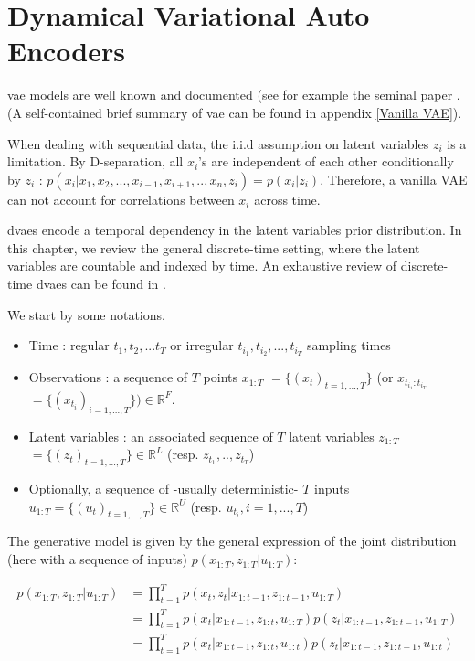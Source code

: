\chapter{Dynamical Variational Auto Encoders}\label{sec:DVAEs}

\gls{vae} models are well known and documented (see for example the seminal paper \cite{kingma_introduction_2019}. (A self-contained brief summary of \gls{vae} can be found in appendix \ref{Vanilla VAE}). 

When dealing with sequential data, the i.i.d assumption on latent variables $z_i$ is a limitation. By D-separation, all $x_i$'s are independent of each other conditionally by $z_i$ : $p(x_i \vert x_1, x_2,...,x_{i-1},x_{i+1},..,x_n,z_i) = p(x_i \vert z_i)$. Therefore, a vanilla VAE can not account for correlations between $x_i$ across time.

\glspl{dvae} encode a temporal dependency in the latent variables prior distribution. In this chapter, we review the general discrete-time setting, where the latent variables are countable and indexed by time. An exhaustive review of discrete-time \glspl{dvae} can be found in \cite{girin_dynamical_2022}.

We start by some notations.

\begin{tcolorbox}[colback=blue!5!white,colframe=black!75!black,title=Notations]
\begin{itemize}
    \item Time : regular $t_1, t_2,... t_T$ or irregular $t_{i_1}, t_{i_2},..., t_{i_T}$ sampling times
    \item Observations : a sequence of $T$ points \textbf{$x_{1:T}$} $= \{(x_t)_{t=1,...,T}\}$ (or \textbf{$x_{t_{i_1}:t_{i_T}}$} $= \{(x_{t_i})_{i=1,...,T}\}) \in \mathbb{R}^F$.
    \item Latent variables : an associated sequence of $T$ latent variables \textbf{$z_{1:T}$} $= \{(z_t)_{t=1,...,T}\} \in \mathbb{R}^L$ (resp. $z_{t_1},..,z_{t_T}$)
    \item Optionally, a sequence of -usually deterministic- $T$ inputs $u_{1:T} = \{(u_t)_{t=1,...,T}\} \in \mathbb{R}^U$ (resp. $u_{t_i}, i=1,...,T$)
\end{itemize}
\end{tcolorbox}

The generative model is given by the general expression of the joint distribution (here with a sequence of inputs) $p(x_{1:T}, z_{1:T} \vert u_{1:T})$:

\begin{align*}
    p(x_{1:T}, z_{1:T} \vert u_{1:T}) &= \prod_{t=1}^T p(x_t, z_t \vert x_{1:t-1}, z_{1:t-1}, u_{1:T}) \\
    &= \prod_{t=1}^T p(x_t \vert x_{1:t-1}, z_{1:t}, u_{1:T}) p(z_t \vert x_{1:t-1}, z_{1:t-1}, u_{1:T}) \\
    &= \prod_{t=1}^T p(x_t \vert x_{1:t-1}, z_{1:t}, u_{1:t}) p(z_t \vert x_{1:t-1}, z_{1:t-1}, u_{1:t})
\end{align*}

